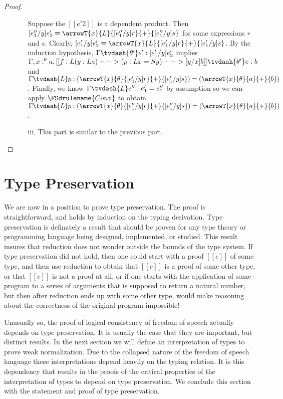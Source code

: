 \begin{proof}
\begin{itemize}
\begin{itemize}
      Suppose the $[[e'2]]$ is a dependent product.  Then 
      $[e''_1/y]e'_2 \equiv \arrowT{x}{L}{[e''_1/y]r}{+}{[e''_1/y]s}$ for some
      expressions $r$ and $s$.  Clearly, $[e'_1/y]e'_2 \equiv
      \arrowT{x}{L}{[e'_1/y]r}{+}{[e'_1/y]s}$.  By the induction
      hypothesis, $\Gamma \tvdash{\theta'} e':[e'_1/y]e'_2$ implies
      $\Gamma,x:^\theta a, [[f : L (y : L a)+ -> (p : L x = S y)- -> [y/x]b]] \tvdash{\theta'} e:b$ and 
      $\Gamma \tvdash{L} p:(\arrowT{x}{\theta}{[e'_1/y]r}{+}{[e'_1/y]s}) =
      (\arrowT{x}{\theta}{a}{+}{b})$.  Finally, we know $\Gamma \tvdash{L} e'':e'_1 = e''_1$ by assumption
      so we can apply $\FSdrulename{Conv}$ to obtain $\Gamma \tvdash{L} p:(\arrowT{x}{\theta}{[e''_1/y]r}{+}{[e''_1/y]s}) = (\arrowT{x}{\theta}{a}{+}{b})$.

    \item[iii.] This part is similar to the previous part.
    \end{itemize}
  \end{itemize}
\end{proof}

\section{Type Preservation}
\label{sec:type_preservation}
We are now in a position to prove type preservation.  The proof is
straightforward, and holds by induction on the typing derivation.
Type preservation is definately a result that should be proven for any
type theory or programming language being designed, implemented, or
studied.  This result insures that reduction does not wonder outside
the bounds of the type system.  If type preservation did not hold,
then one could start with a proof $[[e]]$ of some type, and then use
reduction to obtain that $[[e]]$ is a proof of some other type, or that
$[[e]]$ is not a proof at all, or if one starts with the application
of some program to a series of arguments that is supposed to return a
natural number, but then after reduction ends up with some other type,
would make reasoning about the correctness of the original program
impossible!

Unusually so, the proof of logical consistency of freedom of speech
actually depends on type preservation.  It is usually the case that
they are important, but distinct results.  In the next section we will
define an interpretation of types to prove weak normalization.  Due to
the collapsed nature of the freedom of speech language these
interpretations depend heavily on the typing relation. It is this
dependency that results in the proofs of the critical properties of
the interpretation of types to depend on type preservation.  We
conclude this section with the statement and proof of type
preservation.
 
